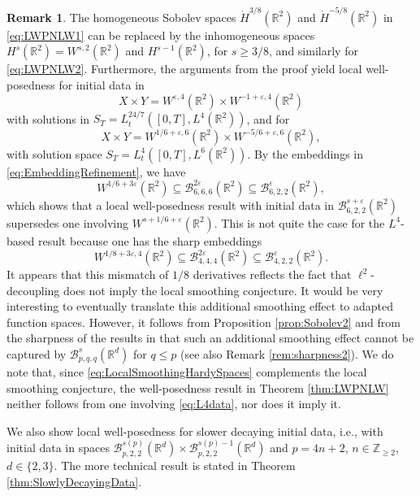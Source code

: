 \documentclass{amsart}
\theoremstyle{definition}
\newtheorem{remark}[theorem]{Remark}
\newcommand{\R}{\mathbb{R}}
\newcommand{\Z}{\mathbb{Z}}
\newcommand {\Rd}{\mathbb{R}^{d}}
\newcommand {\Ba}{\mathcal{B}}
\newcommand {\veps}{\varepsilon}
\numberwithin{equation}{section}
\begin{document}
\begin{remark}
\label{rem:LWP}
The homogeneous Sobolev spaces $\dot{H}^{3/8}(\R^2)$ and $\dot{H}^{-5/8}(\R^2)$ in \eqref{eq:LWPNLW1} can be replaced by the inhomogeneous spaces $H^s(\R^2)=W^{s,2}(\R^2)$ and $H^{s-1}(\R^2)$, for $s \geq 3/8$, and similarly for \eqref{eq:LWPNLW2}.
Furthermore, the arguments from the proof yield local well-posedness for initial data in
\begin{equation}\label{eq:L4data}
X \times Y = W^{\veps,4}(\R^2) \times W^{-1+\veps,4}(\R^2)
\end{equation}
with solutions in $S_T = L_t^{24/7}([0,T],L^4(\R^2))$, and for
\begin{equation*}
X \times Y = W^{1/6+\veps,6}(\R^2) \times W^{-5/6+\veps,6}(\R^2), 
\end{equation*}
with solution space $S_T = L_t^4([0,T],L^6(\R^2))$. By the embeddings in \eqref{eq:EmbeddingRefinement}, we have
\begin{equation*}
W^{1/6+3\veps}(\R^2) \subseteq \mathcal{B}^{2\veps}_{6,6,6}(\R^2) \subseteq \mathcal{B}^{\veps}_{6,2,2}(\R^2),
\end{equation*}
which shows that a local well-posedness result with initial data in $\Ba^{s+\veps}_{6,2,2}(\R^2)$ supersedes one involving $W^{s+1/6+\veps}(\R^2)$. %
This is not quite the case for the $L^4$-based result because one has the sharp embeddings
\begin{equation*}
W^{1/8+3\varepsilon,4}(\R^2) \subseteq \mathcal{B}^{2\varepsilon}_{4,4,4}(\R^2) \subseteq \mathcal{B}^\varepsilon_{4,2,2}(\R^2).
\end{equation*}
It appears that this mismatch of $1/8$ derivatives reflects the fact that $\ell^2$-decoupling does not imply the local smoothing conjecture. It would be very interesting to eventually translate this additional smoothing effect to adapted function spaces. However, it follows from Proposition \ref{prop:Sobolev2} and from the sharpness of the results in \cite{Rozendaal2021LocalSmoothing} that such an additional smoothing effect cannot be captured by $\Ba^{s}_{p,q,q}(\Rd)$ for $q\leq p$ (see also Remark \ref{rem:sharpness2}). We do note that, since \eqref{eq:LocalSmoothingHardySpaces} complements the local smoothing conjecture, the well-posedness result in Theorem \ref{thm:LWPNLW} neither follows from one involving \eqref{eq:L4data}, nor does it imply it.
\end{remark}
We also show local well-posedness for slower decaying initial data, i.e., with initial data in spaces $\mathcal{B}^{s(p)}_{p,2,2}(\R^d) \times \mathcal{B}^{s(p)-1}_{p,2,2}(\R^d)$ and $p=4n+2$, $n \in \Z_{\geq 2}$, $d \in \{2,3\}$. The more technical result is stated in Theorem \ref{thm:SlowlyDecayingData}. 
\end{document}
